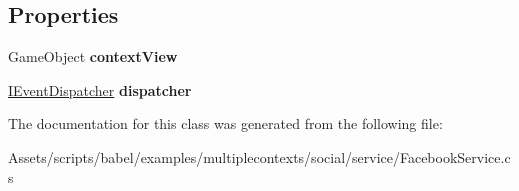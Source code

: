 \subsection*{Properties}
\begin{DoxyCompactItemize}
\item 
\hypertarget{classbabel_1_1examples_1_1multiplecontexts_1_1social_1_1_facebook_service_aecaada0394e66b44f9b333e89804b406}{Game\-Object {\bfseries context\-View}}\label{classbabel_1_1examples_1_1multiplecontexts_1_1social_1_1_facebook_service_aecaada0394e66b44f9b333e89804b406}

\item 
\hypertarget{classbabel_1_1examples_1_1multiplecontexts_1_1social_1_1_facebook_service_a9a4d1bc37ed4905a94f23cc3506f40d7}{\hyperlink{interfacebabel_1_1extensions_1_1dispatcher_1_1eventdispatcher_1_1api_1_1_i_event_dispatcher}{I\-Event\-Dispatcher} {\bfseries dispatcher}}\label{classbabel_1_1examples_1_1multiplecontexts_1_1social_1_1_facebook_service_a9a4d1bc37ed4905a94f23cc3506f40d7}

\end{DoxyCompactItemize}


The documentation for this class was generated from the following file\-:\begin{DoxyCompactItemize}
\item 
Assets/scripts/babel/examples/multiplecontexts/social/service/Facebook\-Service.\-cs\end{DoxyCompactItemize}
